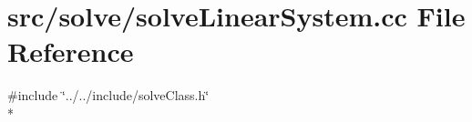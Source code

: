 \section{src/solve/solve\-Linear\-System.cc File Reference}
\label{solve_linear_system_8cc}
{\ttfamily \#include \char`\"{}../../include/solve\-Class.\-h\char`\"{}}\\*
